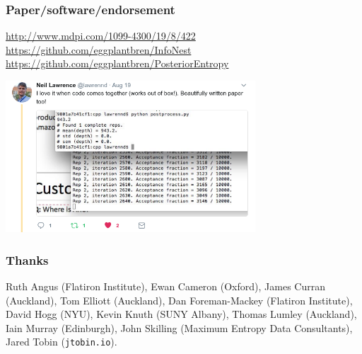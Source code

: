 \documentclass{beamer}
\begin{document}
\begin{frame}
\frametitle{Paper/software/endorsement}

{\color{blue}
\url{http://www.mdpi.com/1099-4300/19/8/422} \\

\url{https://github.com/eggplantbren/InfoNest} \\

\url{https://github.com/eggplantbren/PosteriorEntropy}
}
\vspace{0.5cm}

\begin{center}
\includegraphics[width=0.7\textwidth]{lawrence.png}
\end{center}

\end{frame}



\begin{frame}
\frametitle{Thanks}


Ruth Angus (Flatiron Institute),
Ewan Cameron (Oxford), James Curran (Auckland), Tom Elliott (Auckland),
Dan Foreman-Mackey (Flatiron Institute),
David Hogg (NYU), Kevin Knuth (SUNY Albany),
Thomas Lumley (Auckland),
Iain Murray (Edinburgh), John Skilling
(Maximum Entropy Data Consultants), Jared Tobin ({\tt jtobin.io}).


\end{frame}






\end{document}
